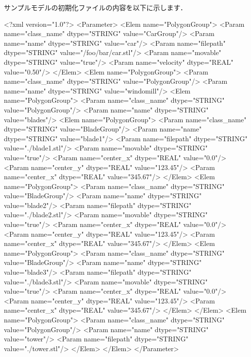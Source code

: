 {サンプルモデルの初期化ファイルの内容を以下に示します．

\begin{program}
<?xml version="1.0"?>
<Parameter>
    <Elem name="PolygonGroup">
        <Param name="class_name" dtype="STRING" value="CarGroup"/>
        <Param name="name"       dtype="STRING" value="car"/>
        <Param name="filepath"   dtype="STRING" value="/foo/bar/car.stl"/>
        <Param name="movable"    dtype="STRING" value="true"/>
        <Param name="velocity"   dtype="REAL"   value="0.50"/>
    </Elem>
    <Elem name="PolygonGroup">
        <Param name="class_name" dtype="STRING" value="PolygonGroup"/>
        <Param name="name"       dtype="STRING" value="windomill"/>
        <Elem name="PolygonGroup">
            <Param name="class_name" dtype="STRING" value="PolygonGroup"/>
            <Param name="name"       dtype="STRING" value="blades"/>
            <Elem name="PolygonGroup">
                <Param name="class_name" dtype="STRING" value="BladeGroup"/>
                <Param name="name"       dtype="STRING" value="blade1"/>
                <Param name="filepath"   dtype="STRING" value="./blade1.stl"/>
                <Param name="movable"    dtype="STRING" value="true"/>
                <Param name="center_x"   dtype="REAL"   value="0.0"/>
                <Param name="center_y"   dtype="REAL"   value="123.45"/>
                <Param name="center_x"   dtype="REAL"   value="345.67"/>
            </Elem>
            <Elem name="PolygonGroup">
                <Param name="class_name" dtype="STRING" value="BladeGroup"/>
                <Param name="name"       dtype="STRING" value="blade2"/>
                <Param name="filepath"   dtype="STRING" value="./blade2.stl"/>
                <Param name="movable"    dtype="STRING" value="true"/>
                <Param name="center_x"   dtype="REAL"   value="0.0"/>
                <Param name="center_y"   dtype="REAL"   value="123.45"/>
                <Param name="center_x"   dtype="REAL"   value="345.67"/>
            </Elem>
            <Elem name="PolygonGroup">
                <Param name="class_name" dtype="STRING" value="BladeGroup"/>
                <Param name="name"       dtype="STRING" value="blade3"/>
                <Param name="filepath"   dtype="STRING" value="./blade3.stl"/>
                <Param name="movable"    dtype="STRING" value="true"/>
                <Param name="center_x"   dtype="REAL"   value="0.0"/>
                <Param name="center_y"   dtype="REAL"   value="123.45"/>
                <Param name="center_x"   dtype="REAL"   value="345.67"/>
            </Elem>
        </Elem>
        <Elem name="PolygonGroup">
            <Param name="class_name" dtype="STRING" value="PolygonGroup"/>
            <Param name="name"       dtype="STRING" value="tower"/>
            <Param name="filepath"   dtype="STRING" value="./tower.stl"/>
        </Elem>
    </Elem>
</Parameter>
\end{program}

}
